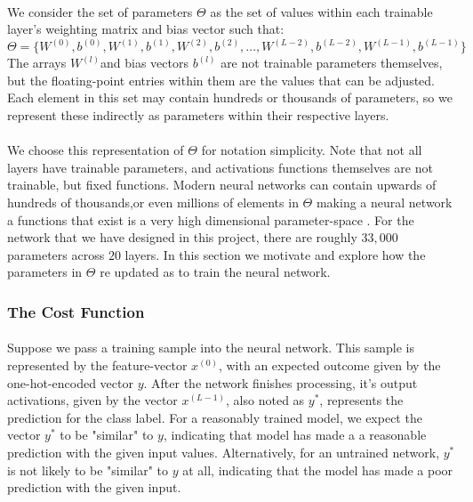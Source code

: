 \documentclass[12pt,letterpaper]{article}
\begin{document}
\paragraph*{}We consider the set of parameters $\Theta$ as the set of values within each trainable layer's weighting matrix and bias vector such that:
\begin{equation}
\label{eqn-Theta}
\Theta = \big\{
W^{(0)}, b^{(0)}, W^{(1)}, b^{(1)}, W^{(2)}, b^{(2)}, ... ,W^{(L-2)}, b^{(L-2)}, W^{(L-1)}, b^{(L-1)}
\big\}
\end{equation}
The arrays $W^{(l)}$and bias vectors $b^{(l)}$ are not trainable parameters themselves, but the floating-point entries within them are the values that can be adjusted. Each element in this set may contain hundreds or thousands of parameters, so we represent these indirectly as parameters within their respective layers. 

\paragraph*{}We choose this representation of $\Theta$ for notation simplicity. Note that not all layers have trainable parameters, and activations functions themselves are not trainable, but fixed functions. Modern neural networks can contain upwards of hundreds of thousands,or even millions of elements in $\Theta$ making a neural network a functions that exist is a very high dimensional parameter-space \cite{Geron,Goodfellow,Levine}. For the network that we have designed in this project, there are roughly $33,000$ parameters across $20$ layers. In this section we motivate and explore how the parameters in $\Theta$ re updated as to train the neural network.


\subsubsection{The Cost Function}

\paragraph*{}Suppose we pass a training sample into the neural network. This sample is represented by the feature-vector $x^{(0)}$, with an expected outcome given by the one-hot-encoded vector $y$.  After the network finishes processing, it's output activations, given by the vector $x^{(L-1)}$, also noted as $y^*$, represents the prediction for the class label. For a reasonably trained model, we expect the vector $y^*$ to be "similar" to $y$, indicating that model has made a a reasonable prediction with the given input values. Alternatively, for an untrained network, $y^*$ is not likely to be "similar" to $y$ at all, indicating that the model has made a poor prediction with the given input.
\end{document}
